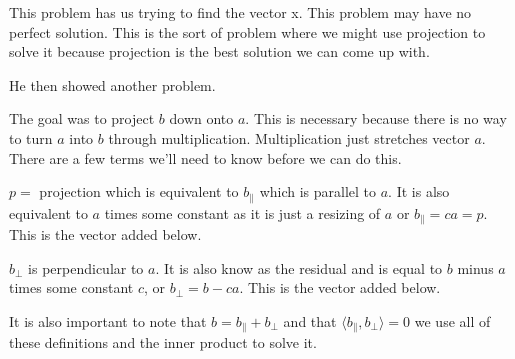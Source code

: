 This problem has us trying to find the vector x. This problem may have no perfect solution. This is the sort of problem where we might use projection to solve it because projection is the best solution we can come up with.

He then showed another problem.


The goal was to project $b$ down onto $a$. This is necessary because there is no way to turn $a$ into $b$ through multiplication. Multiplication just stretches vector $a$. There are a few terms we'll need to know before we can do this.

$p =$ projection which is equivalent to $b_\|$ which is parallel to $a$. It is also equivalent to $a$ times some constant as it is just a resizing of $a$ or $b_\| = ca = p$. This is the vector added below.


$b_\perp$ is perpendicular to $a$. It is also know as the residual and is equal to $b$ minus $a$ times some constant $c$, or $b_\perp = b-ca$. This is the vector added below.


It is also important to note that $b = b_\| + b_\perp$ and that $\langle b_\| , b_\perp \rangle = 0$ we use all of these definitions and the inner product to solve it.

